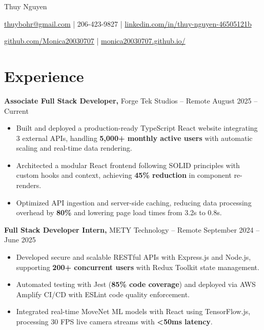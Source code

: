 \documentclass[11pt]{article}
\begin{document}
\centerline{\Huge Thuy Nguyen}

\vspace{5pt}

\centerline{\href{mailto:thuybohr@gmail.com}{thuybohr@gmail.com} | 206-423-9827 |
\href{https://www.linkedin.com/in/thuy-nguyen-46505121b/}{linkedin.com/in/thuy-nguyen-46505121b}}

\centerline{\href{https://github.com/Monica20030707}{github.com/Monica20030707} |
\href{https://monica20030707.github.io/}{monica20030707.github.io/}}

\vspace{-9pt}

\section*{Experience}

\textbf{Associate Full Stack Developer,} {Forge Tek Studios} -- Remote \hfill August 2025 -- Current
\vspace{-9pt}
\begin{itemize}
  \item Built and deployed a production-ready TypeScript React website integrating 3 external APIs, handling \textbf{5,000+ monthly active users} with automatic scaling and real-time data rendering.
  \item Architected a modular React frontend following SOLID principles with custom hooks and context, achieving \textbf{45\% reduction} in component re-renders.
  \item Optimized API ingestion and server-side caching, reducing data processing overhead by \textbf{80\%} and lowering page load times from 3.2s to 0.8s.
\end{itemize}

\textbf{Full Stack Developer Intern,} {METY Technology} -- Remote \hfill September 2024 -- June 2025
\vspace{-9pt}
\begin{itemize}
  \item Developed secure and scalable RESTful APIs with Express.js and Node.js, supporting \textbf{200+ concurrent users} with Redux Toolkit state management.
  \item Automated testing with Jest (\textbf{85\% code coverage}) and deployed via AWS Amplify CI/CD with ESLint code quality enforcement.
  \item Integrated real-time MoveNet ML models with React using TensorFlow.js, processing 30 FPS live camera streams with \textbf{<50ms latency}.
\end{itemize}
\end{document}
